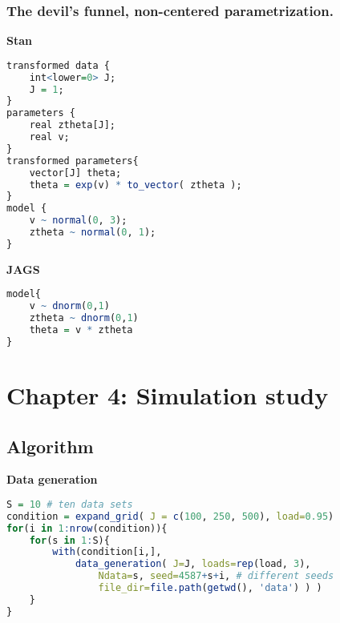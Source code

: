 
\subsubsection{The devil's funnel, non-centered parametrization.}

\noindent \textbf{Stan}
%
\begin{lstlisting}[language=R]
transformed data {
	int<lower=0> J;
	J = 1;
}
parameters {
	real ztheta[J];
	real v;
}
transformed parameters{
	vector[J] theta;
	theta = exp(v) * to_vector( ztheta );
}
model {
	v ~ normal(0, 3);
	ztheta ~ normal(0, 1);
}
\end{lstlisting}


\noindent \textbf{JAGS}
%
\begin{lstlisting}[language=R]
model{
	v ~ dnorm(0,1)
	ztheta ~ dnorm(0,1)
	theta = v * ztheta
}
\end{lstlisting}




\section{Chapter 4: Simulation study} \label{appC2:chapter4}

\subsection{Algorithm} \label{appC2_1:sim}

\noindent \textbf{Data generation}
%
\begin{lstlisting}[language=R]
S = 10 # ten data sets
condition = expand_grid( J = c(100, 250, 500), load=0.95)
for(i in 1:nrow(condition)){
	for(s in 1:S){
		with(condition[i,],
			data_generation( J=J, loads=rep(load, 3), 
				Ndata=s, seed=4587+s+i, # different seeds
				file_dir=file.path(getwd(), 'data') ) )
	}
}
\end{lstlisting}

